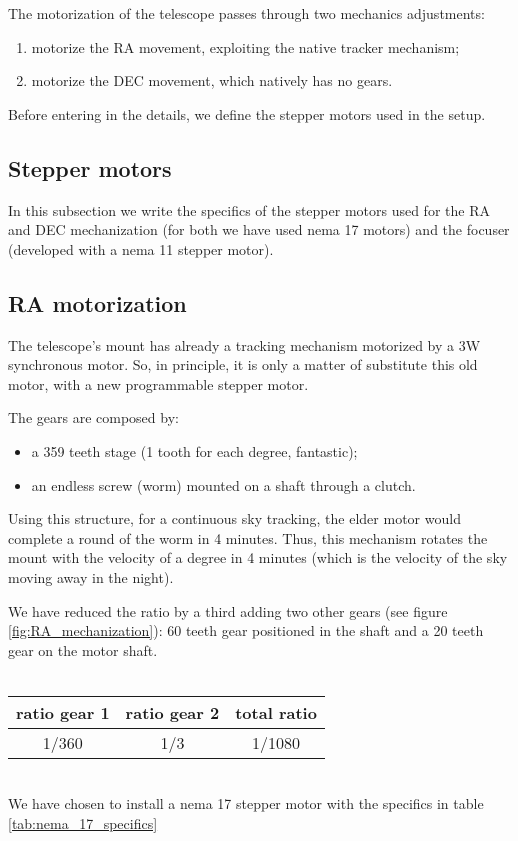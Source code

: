 The motorization of the telescope passes through two mechanics adjustments:
\begin{enumerate}
    \item motorize the RA movement, exploiting the native tracker mechanism;
    \item motorize the DEC movement, which natively has no gears.
\end{enumerate}
Before entering in the details, we define the stepper motors used in the setup.

\subsection{Stepper motors}
In this subsection we write the specifics of the stepper motors used for the RA and DEC mechanization (for both we have used nema 17 motors) and the focuser (developed with a nema 11 stepper motor).

\subsection{RA motorization}
The telescope's mount has already a tracking mechanism motorized by a 3W synchronous motor.
So, in principle, it is only a matter of substitute this old motor, with a new programmable stepper motor.

The gears are composed by:
\begin{itemize}
    \item a 359 teeth stage (1 tooth for each degree, fantastic);
    \item an endless screw (worm) mounted on a shaft through a clutch.
\end{itemize}
Using this structure, for a continuous sky tracking, the elder motor would complete a round of the worm in 4 minutes.
Thus, this mechanism rotates the mount with the velocity of a degree in 4 minutes (which is the velocity of the sky moving away in the night).

We have reduced the ratio by a third adding two other gears (see figure \ref{fig:RA_mechanization}): 60 teeth gear positioned in the shaft and a 20 teeth gear on the motor shaft.
\\
\\
\begin{minipage}{.4\textwidth}
    \centering
    \begin{tabular}{cc|c}
        \hline
        \textbf{ratio gear 1} & \textbf{ratio gear 2} & total \textbf{ratio} \\
        \hline
        1/360 & 1/3 & 1/1080 \\
        \hline
    \end{tabular}
    \label{tab:RA_mechanization}
\end{minipage}
\\
We have chosen to install a nema 17 stepper motor with the specifics in table \ref{tab:nema_17_specifics}

